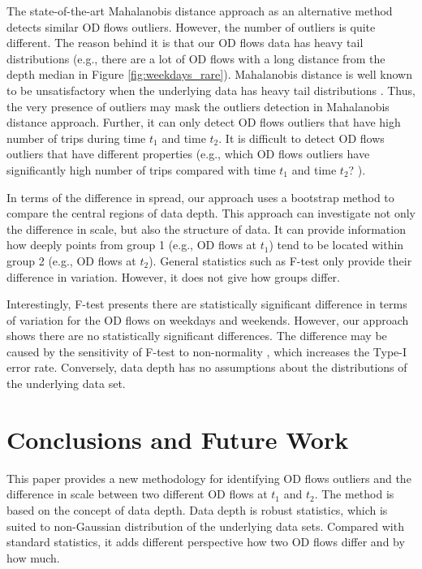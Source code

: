 \documentclass[a4paper,UKenglish]{lipics-v2016}
\begin{document}
The state-of-the-art Mahalanobis distance approach as an alternative method detects similar OD flows outliers. However, the number of outliers is quite different. The reason behind it is that our OD flows data has heavy tail distributions (e.g., there are a lot of OD flows with a long distance from the depth median in Figure \ref{fig:weekdays_rare}). Mahalanobis distance is well known to be unsatisfactory when the underlying data has heavy tail distributions \cite{wilcox12Book}. Thus, the very presence of outliers may mask the outliers detection in Mahalanobis distance approach. Further, it can only detect OD flows outliers that have high number of trips during time $t_1$ and time $t_2$. It is difficult to detect OD flows outliers that have different properties (e.g., which OD flows outliers have significantly high number of trips compared with time $t_1$ and time $t_2$? ).

In terms of the difference in spread, our approach uses a bootstrap method to compare the central regions of data depth. This approach can  investigate not only the difference in scale, but also the structure of data. It can provide information how deeply points from group 1 (e.g., OD flows at $t_1$) tend to be located within group 2 (e.g., OD flows at $t_2$). General statistics such as F-test only provide their difference in variation. However, it does not give how groups differ. 

Interestingly, F-test presents there are statistically significant difference in terms of variation for the OD flows on weekdays and weekends. However, our approach shows there are no statistically significant differences. The difference may be caused by the sensitivity of F-test to non-normality  \cite{Field12book}, which increases the Type-I error rate. Conversely, data depth has no assumptions about the distributions of the underlying data set.

%


\section{Conclusions and Future Work}
\label{sec:conclusions}

This paper provides a new methodology for identifying OD flows outliers and the difference in scale between two different OD flows at $t_1$ and $t_2$. The method is based on the concept of data depth. Data depth is robust statistics, which is suited to non-Gaussian distribution of the underlying data sets. Compared with standard statistics, it adds different perspective how two OD flows differ and by how much. 
\end{document}
